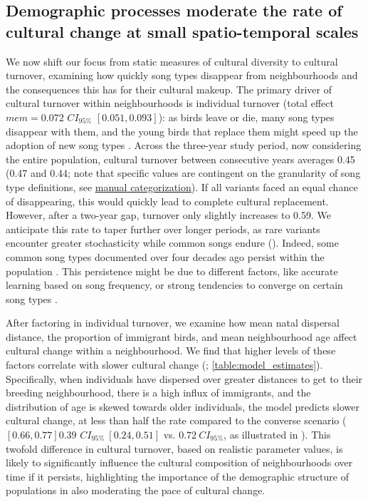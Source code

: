 \documentclass[9pt, onecolumn, twoside, lineno]{gsajnl}
\begin{document}
\subsection{Demographic processes moderate the rate of cultural change at small spatio-temporal scales}

We now shift our focus from static measures of cultural diversity to cultural turnover, examining how quickly song types disappear from neighbourhoods and the consequences this has for their cultural makeup. The primary driver of cultural turnover within neighbourhoods is individual turnover (total effect $mem = 0.072$ $CI_{95\%}$ $[0.051, 0.093]$): as birds leave or die, many song types disappear with them, and the young birds that replace them might speed up the adoption of new song types \autocite{dyble2024}. Across the three-year study period, now considering the entire population, cultural turnover between consecutive years averages 0.45 (0.47 and 0.44; note that specific values are contingent on the granularity of song type definitions, see \hyperref[sc:manual-categorization]{manual categorization}). If all variants faced an equal chance of disappearing, this would quickly lead to complete cultural replacement. However, after a two-year gap, turnover only slightly increases to 0.59. We anticipate this rate to taper further over longer periods, as rare variants encounter greater stochasticity while common songs endure (). Indeed, some common song types documented over four decades ago persist within the population \autocite{mcgregor1982b, keen2020}. This persistence might be due to different factors, like accurate learning based on song frequency, or strong tendencies to converge on certain song types \autocite{lachlan2018, tchernichovski2021, james2017, claidiere2007}.

After factoring in individual turnover, we examine how mean natal dispersal distance, the proportion of immigrant birds, and mean neighbourhood age affect cultural change within a neighbourhood. We find that higher levels of these factors correlate with slower cultural change  (; \autoref{table:model_estimates}). Specifically, when individuals have dispersed over greater distances to get to their breeding neighbourhood, there is a high influx of immigrants, and the distribution of age is skewed towards older individuals, the model predicts slower cultural change, at less than half the rate compared to the converse scenario ($[0.66, 0.77]$$0.39$ $CI_{95\%}~[0.24, 0.51]$ vs. $0.72~CI_{95\%}$, as illustrated in ). This twofold difference in cultural turnover, based on realistic parameter values, is likely to significantly influence the cultural composition of neighbourhoods over time if it persists, highlighting the importance of the demographic structure of populations in also moderating the pace of cultural change.
\end{document}
